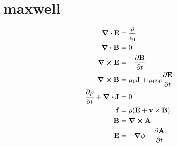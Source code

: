 \section*{maxwell}
\begin{align*}
\div{\vb{E}}&=\frac{\rho}{\epsilon_0}\\
\div{\vb{B}}&=0\\
\curl{\vb{E}}&=-\pdv{\vb{B}}{t}\\
\curl{\vb{B}}&=\mu_0\vb{J}+\mu_0\epsilon_0\pdv{\vb{E}}{t}\\
\pdv{\rho}{t}+\div{\vb{J}}&=0\\
\vb{f}&=\rho\qty(\vb{E}+\vb{v}\times\vb{B})\\
\vb{B}&=\curl{\vb{A}}\\
\vb{E}&=-\grad{\phi}-\pdv{\vb{A}}{t}
\end{align*}
